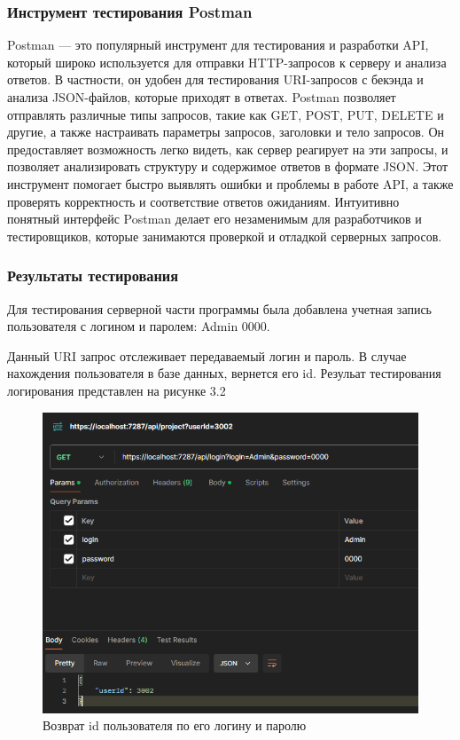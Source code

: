 \subsubsection{Инструмент тестирования Postman}
Postman — это популярный инструмент для тестирования и разработки API, который широко используется для отправки HTTP-запросов к серверу и анализа ответов. В частности, он удобен для тестирования URI-запросов с бекэнда и анализа JSON-файлов, которые приходят в ответах. Postman позволяет отправлять различные типы запросов, такие как GET, POST, PUT, DELETE и другие, а также настраивать параметры запросов, заголовки и тело запросов. Он предоставляет возможность легко видеть, как сервер реагирует на эти запросы, и позволяет анализировать структуру и содержимое ответов в формате JSON. Этот инструмент помогает быстро выявлять ошибки и проблемы в работе API, а также проверять корректность и соответствие ответов ожиданиям. Интуитивно понятный интерфейс Postman делает его незаменимым для разработчиков и тестировщиков, которые занимаются проверкой и отладкой серверных запросов.

\subsubsection{Результаты тестирования}

Для тестирования серверной части программы была добавлена учетная запись пользователя с логином и паролем: Admin 0000. 

Данный URI запрос отслеживает передаваемый логин и пароль. В случае нахождения пользователя в базе данных, вернется его id. Резульат тестирования логирования представлен на рисунке 3.2

\begin{figure}[H]
	\centering
	\includegraphics[width=0.7\linewidth]{images/TestURILogin}
	\caption{Возврат id пользователя по его логину и паролю}
	\label{fig:testurilogin}
\end{figure}

